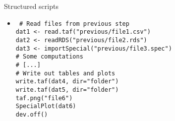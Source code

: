 \documentclass[aspectratio=169]{beamer}
\begin{document}

\begin{frame}{Structured scripts}\small
  \begin{itemize}\item[]\tt\fns
    {\gray \# Read files from previous step}\\
    dat1 <- {\blue read.taf}("previous/file1.csv")\\
    dat2 <- {\blue readRDS}("previous/file2.rds")\\
    dat3 <- {\blue importSpecial}("previous/file3.spec")\\[1em]
    {\gray \# Some computations}\\
    {\gray \# [...]}\\[1em]
    {\gray \# Write out tables and plots}\\
    {\blue write.taf}(dat4, dir="folder")\\
    {\blue write.taf}(dat5, dir="folder")\\
    {\blue taf.png}("file6")\\
    {\blue SpecialPlot}(dat6)\\
    {\blue dev.off}()\\[3ex]
  \end{itemize}
\end{frame}
\end{document}
